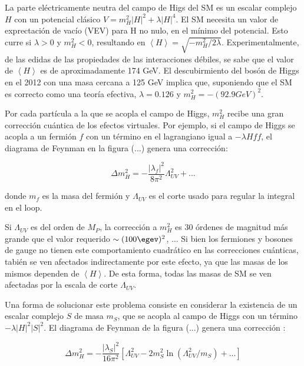 La parte eléctricamente neutra del campo de Higs del SM es un escalar complejo $H$ con un potencial clásico $V=m_{H}^{2}|H|^{2}+\lambda|H|^{4}$. El SM necesita un valor de exprectación de vacío (VEV) para H no nulo, en el mínimo del potencial. Esto curre si $\lambda >0$ y $m_{H}^{2}<0$, resultando en $\left\langle H \right\rangle = \sqrt{-m_{H}^{2}/2\lambda}$. Experimentalmente, de las edidas de las propiedades de las interacciones débiles, se sabe que el valor de $\left\langle H \right\rangle$ es de aproximadamente 174 GeV. El descubirmiento del bosón de Higgs en el 2012 con una masa cercana a 125 GeV implica que, suponiendo que el SM es correcto como una teoría efectiva, $\lambda = 0.126$ y $m_{H}^{2}=-(92.9 GeV)^{2}$.

Por cada partícula a la que se acopla el campo de Higgs, $m_{H}^{2}$ recibe una gran corrección cuántica de los efectos virtuales. Por ejemplo, si el campo de Higgs se acopla a un fermión $f$ con un término en el lagrangiano igual a $-\lambda H\hat{f}f$, el diagrama de Feynman en la figura (...) genera una corrección:

\begin{equation}
\Delta m_{H}^{2}=-\frac{|\lambda_{f}|^{2}}{8\pi^{2}}\Lambda_{UV}^{2}+...
\label{fermion_corr}
\end{equation}

donde $m_{f}$ es la masa del fermión y $\Lambda_{UV}$ es el corte usado para regular la integral en el loop. 

Si $\Lambda_{UV}$ es del orden de $M_{P}$, la corrección a $m_{H}^{2}$ es 30 órdenes de magnitud más grande que el valor requerido $\sim (100 \egev)^{2}$, ... Si bien los fermiones y bosones de gauge no tienen este comportamiento cuadrático en las correcciones cuánticas, tabién se ven afectados indirectamente por este efecto, ya que las masas de los mismos dependen de $\left\langle H \right\rangle$. De esta forma, todas las masas de SM se ven afectadas por la escala de corte $\Lambda_{UV}$.

Una forma de solucionar este problema consiste en considerar la existencia de un escalar complejo $S$ de masa $m_{S}$, que se acopla al campo de Higgs con un término $-\lambda |H|^{2}|S|^{2}$. El diagrama de Feynman de la figura (...) genera una corrección :

\begin{equation}
\Delta m_{H}^{2}=-\frac{|\lambda_{S}|^{2}}{16\pi^{2}}\left[\Lambda_{UV}^{2}-2m_{S}^{2}\ln(\Lambda_{UV}^{2}/m_{S})+...\right]
\label{boson_corr}
\end{equation}

